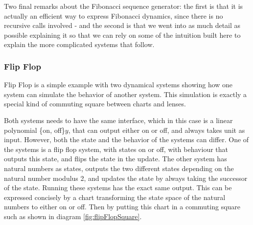 Two final remarks about the Fibonacci sequence generator: the first is that it is actually an efficient way to express Fibonacci dynamics, since there is no recursive calls involved - and the second is that we went into as much detail as possible explaining it so that we can rely on some of the intuition built here to explain the more complicated systems that follow.

\subsubsection{Flip Flop}
Flip Flop is a simple example with two dynamical systems showing how one system can simulate the behavior of another system. This simulation is exactly a special kind of commuting square between charts and lenses. 

Both systems needs to have the same interface, which in this case is a linear polynomial \{on, off\}$y$, that can output either on or off, and always takes unit as input. However, both the state and the behavior of the systems can differ. One of the systems is a flip flop system, with states on or off, with behaviour that outputs this state, and flips the state in the update. The other system has natural numbers as states, outputs the two different states depending on the natural number modulus 2, and updates the state by always taking the successor of the state. Running these systems has the exact same output. This can be expressed concisely by a chart transforming the state space of the natural numbers to either on or off. Then by putting this chart in a commuting square such as shown in diagram \ref{fig:flipFlopSquare}.


